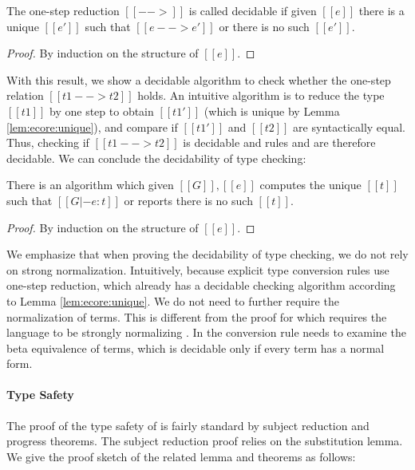 \begin{lem}\label{lem:ecore:unique}
	The one-step reduction $[[-->]]$ is called decidable if 
given $[[e]]$ there is a unique $[[e']]$ such that $[[e --> e']]$ or
there is no such $[[e']]$.
\end{lem}

\begin{proof}
	By induction on the structure of $[[e]]$.
\end{proof}

With this result, we show a decidable algorithm to check whether
the one-step relation $[[t1 --> t2]]$ holds. An intuitive algorithm is to
reduce the type $[[t1]]$ by one step to obtain $[[t1']]$ (which is
unique by Lemma \ref{lem:ecore:unique}), and compare if $[[t1']]$ and
$[[t2]]$ are syntactically equal. Thus, checking if $[[t1 --> t2]]$ is
decidable and rules  and  are
therefore decidable. We can conclude the decidability of type
checking:

\begin{thm}\label{lem:ecore:decide}
	There is an algorithm which given $[[G]], [[e]]$ computes the unique
$[[t]]$ such that $[[G |- e:t]]$ or reports there is no such $[[t]]$.
\end{thm}

\begin{proof}
	By induction on the structure of $[[e]]$.
\end{proof}

We emphasize that when proving the decidability of type checking, we
do not rely on strong normalization. Intuitively, because
explicit type conversion rules use one-step reduction, which already
has a decidable checking algorithm according to Lemma
\ref{lem:ecore:unique}. We do not need to further require the
normalization of terms. This is different from the proof for \cc which
requires the language to be strongly normalizing
\cite{pts:normalize}. In \cc the conversion rule needs to examine
the beta equivalence of terms, which is decidable only if every term
has a normal form.

\paragraph{Type Safety}
The proof of the type safety of \ecore is fairly standard by subject
reduction and progress theorems. The subject reduction proof relies on
the substitution lemma. We give the proof sketch of the related lemma and
theorems as follows:

